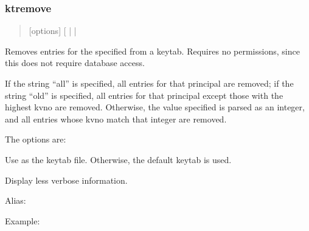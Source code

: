 \documentclass[letterpaper,10pt,english]{sphinxmanual}
\begin{document}
\subsubsection{ktremove}
\label{\detokenize{admin/admin_commands/kadmin_local:ktremove}}\label{\detokenize{admin/admin_commands/kadmin_local:id19}}\begin{quote}

\sphinxAtStartPar
{} {[}options{]}  {[} |  | \sphinxstyleemphasis{old}{]}
\end{quote}

\sphinxAtStartPar
Removes entries for the specified  from a keytab.  Requires
no permissions, since this does not require database access.

\sphinxAtStartPar
If the string “all” is specified, all entries for that principal are
removed; if the string “old” is specified, all entries for that
principal except those with the highest kvno are removed.  Otherwise,
the value specified is parsed as an integer, and all entries whose
kvno match that integer are removed.

\sphinxAtStartPar
The options are:
\begin{description}
\sphinxAtStartPar
Use  as the keytab file.  Otherwise, the default keytab is
used.

\sphinxAtStartPar
Display less verbose information.

\end{description}

\sphinxAtStartPar
Alias: 

\sphinxAtStartPar
Example:

\begin{sphinxVerbatim}[commandchars=\\\{\}]
   
         
\end{sphinxVerbatim}
\end{document}
